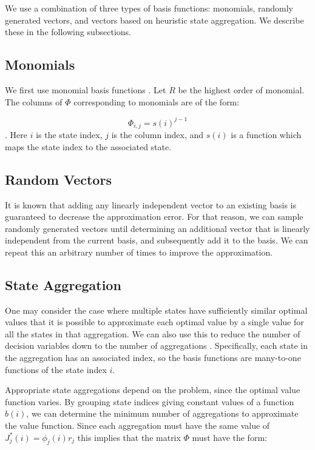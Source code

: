 \documentclass[conference]{IEEEtran}
\begin{document}
We use a combination of three types of basis functions: monomials, randomly generated vectors, and vectors based on heuristic state aggregation. We describe these in the following subsections.

\subsection{Monomials}
    We first use monomial basis functions \cite{bertsekas1995dynamic,478953}. Let $R$ be the highest order of monomial. The columns of $\Phi$ corresponding to monomials are of the form:
	
	\begin{displaymath}
        \Phi_{i,j}=s(i)^{j-1}
    \end{displaymath}. Here $i$ is the state index, $j$ is the column index, and $s(i)$ is a function which maps the state index to the associated state. %

\subsection{Random Vectors}
    It is known that adding any linearly independent vector to an existing basis is guaranteed to decrease the approximation error. For that reason, we can sample randomly generated vectors until determining an additional vector that is linearly independent from the current basis, and subsequently add it to the basis. We can repeat this an arbitrary number of times to improve the approximation.


 \subsection{State Aggregation}
    
    One may consider the case where multiple states have sufficiently similar optimal values that it is possible to approximate each optimal value by a single value for all the states in that aggregation. We can also use this to reduce the number of decision variables down to the number of aggregations \cite{5717627}. Specifically, each state in the aggregation has an associated index, so the basis functions are many-to-one functions of the state index $i$.
    
    Appropriate state aggregations depend on the problem, since the optimal value function varies. By grouping state indices giving constant values of a function $b(i)$, we can determine the minimum number of aggregations to approximate the value function. Since each aggregation must have the same value of $J^{*}_{j}(i) = \phi_{j}(i)r_{j}$ this implies that the matrix $\Phi$ must have the form:
    
\end{document}

